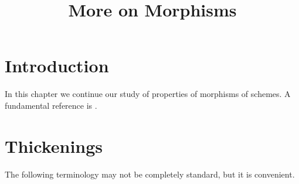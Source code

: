 

%


\title{More on Morphisms}


\maketitle

\label{section-phantom}

\tableofcontents

\section{Introduction}
\label{section-introduction}

\noindent
In this chapter we continue our study of properties of morphisms of schemes.
A fundamental reference is \cite{EGA}.






\section{Thickenings}
\label{section-thickenings}

\noindent
The following terminology may not be completely standard, but it is convenient.


